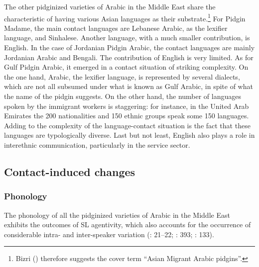 \documentclass[output=paper]{langsci/langscibook}
\begin{document}
The other pidginized varieties of Arabic in the Middle East share the characteristic of having various Asian languages as their substrate.\footnote{Bizri (\citeyear[385]{Bizri2014}) therefore suggests the cover term “Asian Migrant Arabic pidgins”.} For Pidgin Madame, the main contact languages are Lebanese Arabic, as the lexifier language, and Sinhalese. Another language, with a much smaller contribution, is English. In the case of Jordanian Pidgin Arabic, the contact languages are mainly Jordanian Arabic and Bengali. The contribution of English is very limited. As for Gulf Pidgin Arabic, it emerged in a contact situation of striking complexity. On the one hand, Arabic, the lexifier language, is represented by several dialects, which are not all subsumed under what is known as Gulf Arabic, in spite of what the name of the pidgin suggests. On the other hand, the number of languages spoken by the immigrant workers is staggering: for instance, in the United Arab Emirates the 200 nationalities and 150 ethnic groups speak some 150 languages. Adding to the complexity of the language-contact situation is the fact that these languages are typologically diverse. Last but not least, English also plays a role in interethnic communication, particularly in the service sector.


 
 \subsection{Contact-induced changes}
 \subsubsection{Phonology}

The phonology of all the pidginized varieties of Arabic in the Middle East exhibits the outcomes of SL agentivity, which also accounts for the occurrence of considerable intra- and  inter-speaker variation (\citealt{Avram2010}: 21–22; \citealt{Bizri2014}: 393; \citealt{Avram2017article}: 133).
\end{document}
